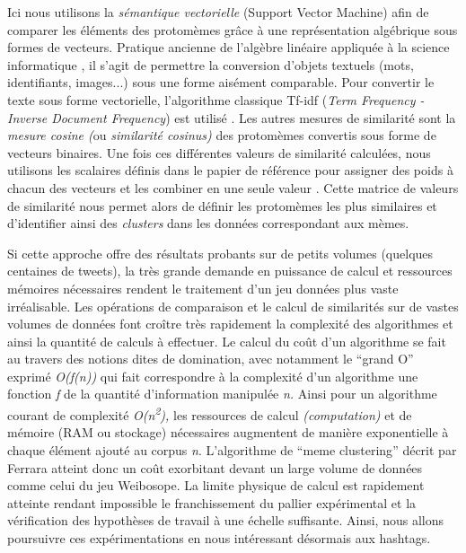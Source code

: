 Ici nous utilisons la \textit{sémantique vectorielle} (Support Vector Machine) afin de comparer les éléments des protomèmes gr\^ace à une représentation algébrique sous formes de vecteurs. Pratique ancienne de l{\textquoteright}algèbre linéaire appliquée à la science informatique \citep{Salton1975}, il s{\textquoteright}agit de permettre la conversion d{\textquoteright}objets textuels (mots, identifiants, images...) sous une forme aisément comparable. Pour convertir le texte sous forme vectorielle, l{\textquoteright}algorithme classique Tf-idf (\textit{Term Frequency - Inverse Document Frequency}) est utilisé \citep{Soucy2005}. Les autres mesures de similarité sont la \textit{mesure cosine (}ou \textit{similarité cosinus) }des protomèmes convertis sous forme de vecteurs binaires. Une fois ces différentes valeurs de similarité calculées, nous utilisons les scalaires définis dans le papier de référence pour assigner des poids à chacun des vecteurs et les combiner en une seule valeur \citep{Ferrara2013}. Cette matrice de valeurs de similarité nous permet alors de définir les protomèmes les plus similaires et d{\textquoteright}identifier ainsi des \textit{clusters }dans les données correspondant aux mèmes.


Si cette approche offre des résultats probants sur de petits volumes (quelques centaines de tweets), la très grande demande en puissance de calcul et ressources mémoires nécessaires rendent le traitement d{\textquoteright}un jeu données plus vaste irréalisable. Les opérations de comparaison et le calcul de similarités sur de vastes volumes de données font cro\^itre très rapidement la complexité des algorithmes et ainsi la quantité de calculs à effectuer. Le calcul du co\^ut d{\textquoteright}un algorithme se fait au travers des notions dites de domination, avec notamment le {\textquotedblleft}grand O{\textquotedblright} exprimé \textit{O(f(n)) }qui fait correspondre à la complexité d{\textquoteright}un algorithme une fonction \textit{f} de la quantité d{\textquoteright}information manipulée \textit{n. }Ainsi pour un algorithme courant de complexité \textit{O(n}\textit{\textsuperscript{2}}\textit{), }les ressources de calcul \textit{(computation)} et de mémoire (RAM ou stockage) nécessaires augmentent de manière exponentielle à chaque élément ajouté au corpus \textit{n}. L{\textquoteright}algorithme de {\textquotedblleft}meme clustering{\textquotedblright} décrit par Ferrara atteint donc un co\^ut exorbitant devant un large volume de données comme celui du jeu Weibosope. La limite physique de calcul est rapidement atteinte rendant impossible le franchissement du pallier expérimental et la vérification des hypothèses de travail à une échelle suffisante. Ainsi, nous allons poursuivre ces expérimentations en nous intéressant désormais aux hashtags.

